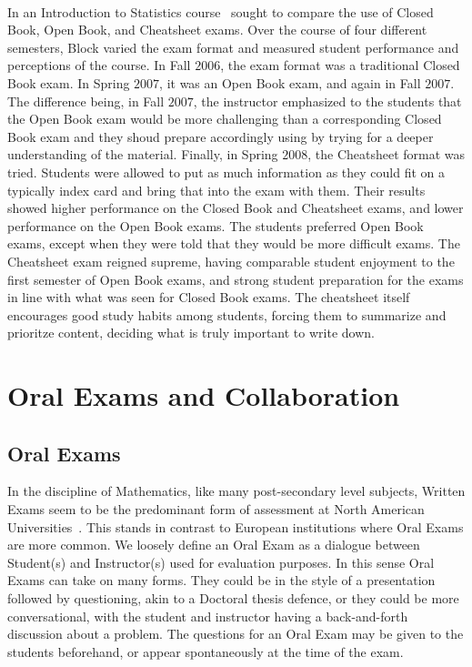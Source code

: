 \documentclass[12pt]{article}
\begin{document}
\paragraph{}
In an Introduction to Statistics course~\cite{block2012discussion} sought to compare the use of Closed Book, Open Book, and Cheatsheet exams. Over the course of four different semesters, Block varied the exam format and measured student performance and perceptions of the course. In Fall $2006$, the exam format was a traditional Closed Book exam. In Spring $2007$, it was an Open Book exam, and again in Fall $2007$. The difference being, in Fall $2007$, the instructor emphasized to the students that the Open Book exam would be more challenging than a corresponding Closed Book exam and they shoud prepare accordingly using by trying for a deeper understanding of the material. Finally, in Spring $2008$, the Cheatsheet format was tried. Students were allowed to put as much information as they could fit on a typically index card and bring that into the exam with them. Their results showed higher performance on the Closed Book and Cheatsheet exams, and lower performance on the Open Book exams. The students preferred Open Book exams, except when they were told that they would be more difficult exams. The Cheatsheet exam reigned supreme, having comparable student enjoyment to the first semester of Open Book exams, and strong student preparation for the exams in line with what was seen for Closed Book exams. The cheatsheet itself encourages good study habits among students, forcing them to summarize and prioritze content, deciding what is truly important to write down.

\section{Oral Exams and Collaboration}\label{sec:communication}
\subsection{Oral Exams}\label{subsec:oral}
In the discipline of Mathematics, like many post-secondary level subjects, Written Exams seem to be the predominant form of assessment at North American Universities~\cite{gold1999assessment}. This stands in contrast to European institutions where Oral Exams are more common.  We loosely define an Oral Exam as a dialogue between Student(s) and Instructor(s) used for evaluation purposes. In this sense Oral Exams can take on many forms. They could be in the style of a presentation followed by questioning, akin to a Doctoral thesis defence, or they could be more conversational, with the student and instructor having a back-and-forth discussion about a problem. The questions for an Oral Exam may be given to the students beforehand, or appear spontaneously at the time of the exam.
\end{document}
